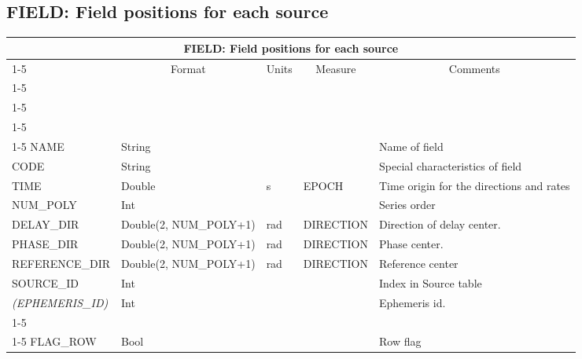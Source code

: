 \documentclass{article}
\newcommand{\defline}[1]{\cline{1-5}
\multicolumn{5}{|l|}{#1} \\
\cline{1-5}}
\newcommand{\definetable}[2]
{
	\vfill\newpage
	\subsection{#1}
        \vspace{0.15in}
        \small
	\begin{tabular}{|l|p{1.25in}|l|p{.9in}|p{1.4in}|}
	\hline
	\multicolumn{5}{|c|}{\bf #1}\\ 
	\cline{1-5}
        \multicolumn{1}{|c|}{Name}&\multicolumn{1}{|c|}{Format}&
        \multicolumn{1}{|c|}{Units}&\multicolumn{1}{|c|}{Measure}&
        \multicolumn{1}{|c|}{Comments}\\
        \cline{1-5}
        #2
        \hline
	\end{tabular}
}
\begin{document}
\definetable{FIELD: Field positions for each source}{
\defline{\bf Columns}
\defline{\em Key}
\defline{\em Data}  
NAME &       String &    &      & Name of field \\
CODE &       String &    &      & Special characteristics of field \\
TIME &   Double  &      s  & EPOCH & Time origin for the directions and rates\\
NUM\_POLY & Int & & & Series order \\
DELAY\_DIR    &      Double(2, NUM\_POLY+1)  &      rad   &     DIRECTION & Direction of delay center. \\
PHASE\_DIR    &      Double(2, NUM\_POLY+1)  &      rad   &     DIRECTION & Phase center. \\
REFERENCE\_DIR &      Double(2, NUM\_POLY+1)  &      rad   &     DIRECTION & Reference center \\
SOURCE\_ID &      Int    &    &      & Index in Source table\\
{\it (EPHEMERIS\_ID)} &   Int    &    &      & Ephemeris id.\\
\defline{Flags}
FLAG\_ROW & Bool & & & Row flag\\
}
\end{document}
